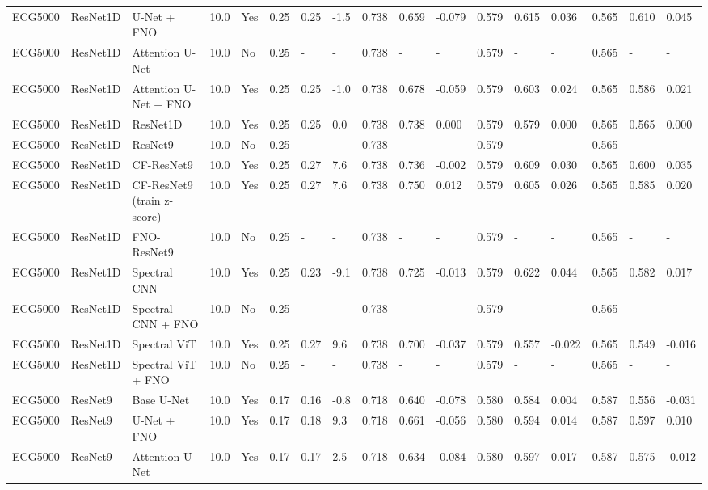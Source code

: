 \begin{longtable}{lllllllllllllllll}
ECG5000 & ResNet1D & U-Net + FNO & 10.0 & Yes & 0.25 & 0.25 & -1.5 & 0.738 & 0.659 & -0.079 & 0.579 & 0.615 & 0.036 & 0.565 & 0.610 & 0.045 \\
ECG5000 & ResNet1D & Attention U-Net & 10.0 & No & 0.25 & - & - & 0.738 & - & - & 0.579 & - & - & 0.565 & - & - \\
ECG5000 & ResNet1D & Attention U-Net + FNO & 10.0 & Yes & 0.25 & 0.25 & -1.0 & 0.738 & 0.678 & -0.059 & 0.579 & 0.603 & 0.024 & 0.565 & 0.586 & 0.021 \\
ECG5000 & ResNet1D & ResNet1D & 10.0 & Yes & 0.25 & 0.25 & 0.0 & 0.738 & 0.738 & 0.000 & 0.579 & 0.579 & 0.000 & 0.565 & 0.565 & 0.000 \\
ECG5000 & ResNet1D & ResNet9 & 10.0 & No & 0.25 & - & - & 0.738 & - & - & 0.579 & - & - & 0.565 & - & - \\
ECG5000 & ResNet1D & CF-ResNet9 & 10.0 & Yes & 0.25 & 0.27 & 7.6 & 0.738 & 0.736 & -0.002 & 0.579 & 0.609 & 0.030 & 0.565 & 0.600 & 0.035 \\
ECG5000 & ResNet1D & CF-ResNet9 (train z-score) & 10.0 & Yes & 0.25 & 0.27 & 7.6 & 0.738 & 0.750 & 0.012 & 0.579 & 0.605 & 0.026 & 0.565 & 0.585 & 0.020 \\
ECG5000 & ResNet1D & FNO-ResNet9 & 10.0 & No & 0.25 & - & - & 0.738 & - & - & 0.579 & - & - & 0.565 & - & - \\
ECG5000 & ResNet1D & Spectral CNN & 10.0 & Yes & 0.25 & 0.23 & -9.1 & 0.738 & 0.725 & -0.013 & 0.579 & 0.622 & 0.044 & 0.565 & 0.582 & 0.017 \\
ECG5000 & ResNet1D & Spectral CNN + FNO & 10.0 & No & 0.25 & - & - & 0.738 & - & - & 0.579 & - & - & 0.565 & - & - \\
ECG5000 & ResNet1D & Spectral ViT & 10.0 & Yes & 0.25 & 0.27 & 9.6 & 0.738 & 0.700 & -0.037 & 0.579 & 0.557 & -0.022 & 0.565 & 0.549 & -0.016 \\
ECG5000 & ResNet1D & Spectral ViT + FNO & 10.0 & No & 0.25 & - & - & 0.738 & - & - & 0.579 & - & - & 0.565 & - & - \\
ECG5000 & ResNet9 & Base U-Net & 10.0 & Yes & 0.17 & 0.16 & -0.8 & 0.718 & 0.640 & -0.078 & 0.580 & 0.584 & 0.004 & 0.587 & 0.556 & -0.031 \\
ECG5000 & ResNet9 & U-Net + FNO & 10.0 & Yes & 0.17 & 0.18 & 9.3 & 0.718 & 0.661 & -0.056 & 0.580 & 0.594 & 0.014 & 0.587 & 0.597 & 0.010 \\
ECG5000 & ResNet9 & Attention U-Net & 10.0 & Yes & 0.17 & 0.17 & 2.5 & 0.718 & 0.634 & -0.084 & 0.580 & 0.597 & 0.017 & 0.587 & 0.575 & -0.012 \\

\end{longtable}
